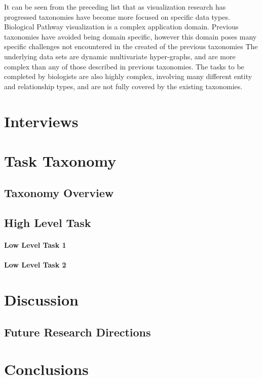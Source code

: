 \documentclass{egpubl}
\begin{document}
It can be seen from the preceding list that as visualization research has progressed taxonomies have become more focused on specific data types.
Biological Pathway visualization is a complex application domain.
Previous taxonomies have avoided being domain specific, however this domain poses many specific challenges not encountered in the created of the previous taxonomies
The underlying data sets are dynamic multivariate hyper-graphs, and are more complex than any of those described in previous taxonomies.
The tasks to be completed by biologists are also highly complex, involving many different entity and relationship types, and are not fully covered by the existing taxonomies.




\section{Interviews}

\section{Task Taxonomy}
\subsection{Taxonomy Overview}
\subsection{High Level Task}
\paragraph{Low Level Task 1}
\paragraph{Low Level Task 2}




\section{Discussion}

\subsection{Future Research Directions}

\section{Conclusions}




%



\end{document}
